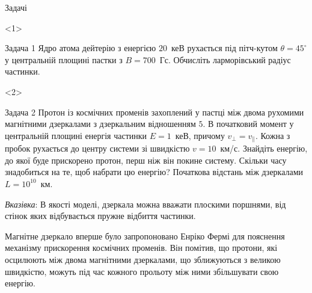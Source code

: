 \documentclass[]{beamer}
\begin{document}
\begin{frame}{Задачі}{}
	\begin{onlyenv}
		\begin{exampleblock}{Задача 1}\justifying%
			Ядро атома дейтерію з енергією $20$~кеВ рухається під пітч-кутом $\theta = 45^\circ$ у центральній площині пастки з $B = 700$~Гс. Обчисліть ларморівський радіус частинки.
		\end{exampleblock}
	\end{onlyenv}
	\begin{onlyenv}
		\begin{exampleblock}{Задача 2}\justifying%
			Протон із космічних променів захоплений у пастці між двома
			рухомими магнітними дзеркалами з дзеркальним відношенням $5$. В  початковий момент у центральній площині енергія частинки $E = 1$~кеВ, причому $v_\perp= v_\parallel$. Кожна з пробок рухається до центру системи зі швидкістю $v = 10$~км/с. Знайдіть енергію, до якої буде прискорено протон, перш ніж він покине систему. Скільки часу знадобиться на те, щоб набрати цю енергію?
			Початкова відстань між дзеркалами $L = 10^{10}$~км.

			\smallskip

			\emph{Вказівка}: В якості моделі, дзеркала можна вважати плоскими поршнями, від стінок яких відбувається пружне відбиття частинки.


			\bigskip

			{\scriptsize Магнітне дзеркало вперше було запропоновано Енріко Фермі для пояснення механізму прискорення космічних променів. Він помітив, що протони, які осцилюють між двома магнітними дзеркалами, що зближуються з великою швидкістю, можуть під час кожного прольоту між ними збільшувати свою енергію.}

		\end{exampleblock}
	\end{onlyenv}
\end{frame}
\end{document}
